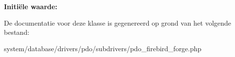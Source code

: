 {\bfseries Initi\"{e}le waarde\+:}
\begin{DoxyCode}{0}
\DoxyCodeLine{        \textcolor{stringliteral}{'SMALLINT'}  => \textcolor{stringliteral}{'INTEGER'},}
\DoxyCodeLine{        \textcolor{stringliteral}{'INTEGER'}   => \textcolor{stringliteral}{'INT64'},}
\DoxyCodeLine{        \textcolor{stringliteral}{'FLOAT'}     => \textcolor{stringliteral}{'DOUBLE PRECISION'}}
\DoxyCodeLine{    )}

\end{DoxyCode}


De documentatie voor deze klasse is gegenereerd op grond van het volgende bestand\+:\begin{DoxyCompactItemize}
\item 
system/database/drivers/pdo/subdrivers/pdo\+\_\+firebird\+\_\+forge.\+php\end{DoxyCompactItemize}

